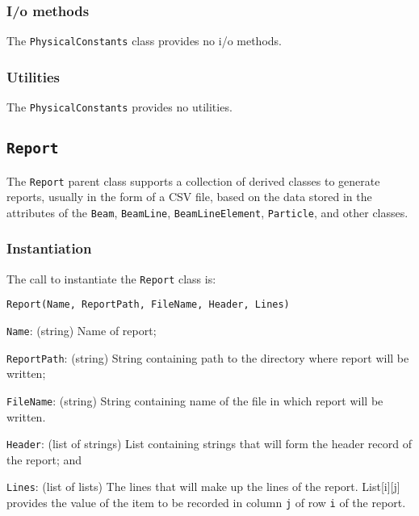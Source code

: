 \subsubsection{I/o methods}
\noindent
The \texttt{PhysicalConstants} class provides no i/o methods.

\subsubsection{Utilities}
\noindent
The \texttt{PhysicalConstants} provides no utilities.

\FloatBarrier

\subsection{\texttt{Report}}
\label{SubSect:Rprt}

The \texttt{Report} parent class supports a collection of derived
classes to generate reports, usually in the form of a CSV file, based
on the data stored in the attributes of
the \texttt{Beam}, \texttt{BeamLine}, \texttt{BeamLineElement}, \texttt{Particle},
and other classes.

\subsubsection{Instantiation}
\noindent
The call to instantiate the \texttt{Report} class is:
\begin{center}
  \texttt{Report(Name, ReportPath, FileName, Header, Lines)}
\end{center}
\begin{description}
  \item{\texttt{Name}}: (string) Name of report;
  \item{\texttt{ReportPath}}: (string) String containing path to the
    directory where report will be written; 
  \item{\texttt{FileName}}: (string) String containing name of the
   file in which report will be written.
  \item{\texttt{Header}}: (list of strings) List containing strings
    that will form the header record of the report; and
  \item{\texttt{Lines}}: (list of lists) The lines that will
    make up the lines of the report.
    List[i][j] provides the value of the item to be recorded in
    column \texttt{j} of row \texttt{i} of the report.
\end{description}

